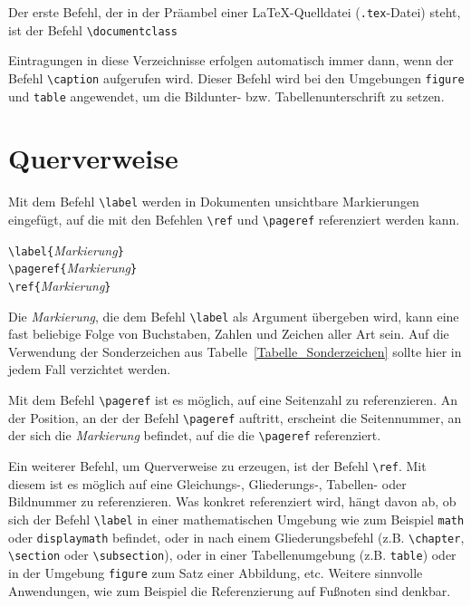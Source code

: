 Der erste Befehl, der in der Präambel einer \LaTeX-Quelldatei (\verb!.tex!-Datei) steht, ist der Befehl \verb!\documentclass!
\begin{document}

Eintragungen in diese Verzeichnisse erfolgen automatisch immer dann, wenn der Befehl
\verb!\caption! aufgerufen wird. Dieser Befehl wird bei den Umgebungen \verb!figure! und \verb!table! angewendet, um die Bildunter- bzw. Tabellenunterschrift zu setzen.


\section{Querverweise}

Mit dem Befehl \verb!\label! werden in Dokumenten 
unsichtbare Markierungen eingefügt, auf die mit den Befehlen 
\verb!\ref! und \verb!\pageref! referenziert werden kann.

\begin{boxedminipage}{\textwidth}
\texttt{\textbackslash label\{}\textsl{Markierung}\texttt{\}} \\
\texttt{\textbackslash pageref\{}\textsl{Markierung}\texttt{\}} \\
\texttt{\textbackslash ref\{}\textsl{Markierung}\texttt{\}}
\end{boxedminipage}

Die \textsl{Markierung}, die dem Befehl \verb!\label!
als Argument übergeben wird, kann 
eine fast beliebige Folge von Buchstaben,
Zahlen und Zeichen aller Art sein. Auf die Verwendung der Sonderzeichen
aus Tabelle~\ref{Tabelle_Sonderzeichen} sollte hier in jedem Fall verzichtet werden.


Mit dem Befehl \verb!\pageref!
ist es möglich, auf eine Seitenzahl zu referenzieren.
An der Position, an der der Befehl \verb!\pageref! auftritt, 
erscheint die Seitennummer, an der sich die 
\textsl{Markierung} befindet, auf die die \verb!\pageref! referenziert.

Ein weiterer Befehl, um Querverweise zu erzeugen, 
ist der Befehl \verb!\ref!. Mit diesem ist es möglich auf eine
Gleichungs-, Gliederungs-, Tabellen- oder Bildnummer zu referenzieren.
Was konkret referenziert wird, hängt davon ab, ob sich der Befehl \verb!\label! in einer 
mathematischen Umgebung wie zum Beispiel
\verb!math! oder \verb!displaymath! befindet, oder in nach einem Gliederungsbefehl (z.B. 
\texttt{\textbackslash chapter}, \texttt{\textbackslash section} oder \texttt{\textbackslash subsection}), oder in einer Tabellenumgebung (z.B. \verb!table!) oder
in der Umgebung \verb!figure! zum Satz einer Abbildung, etc. Weitere sinnvolle Anwendungen, wie zum Beispiel die 
Referenzierung auf Fußnoten sind denkbar.
\end{document}

